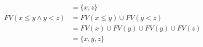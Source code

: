 \documentclass{article}
\begin{document}
\begin{equation*}
\begin{aligned}
		                                                                                           & = \{x, z\}                                                                                \\
		FV(x \leq y \land y < z)                                                                   & = FV(x \leq y) \cup FV(y < z)                                                             \\
		                                                                                           & = FV(x) \cup FV(y) \cup FV(y) \cup FV(z)                                                  \\
		                                                                                           & = \{x, y, z\}
	\end{aligned}
\end{equation*}
\end{document}

